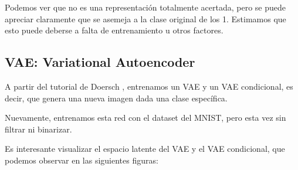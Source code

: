 \documentclass[11pt]{article}
\begin{document}
Podemos ver que no es una representación totalmente acertada, pero se puede apreciar claramente que se asemeja a la clase original de los 1. Estimamos que esto puede deberse a falta de entrenamiento u otros factores.
\newpage
\subsection{VAE: Variational Autoencoder}

A partir del tutorial de Doersch \cite{vae}, entrenamos un VAE y un VAE condicional, es decir, que genera una nueva imagen dada una clase específica.

Nuevamente, entrenamos esta red con el dataset del MNIST, pero esta vez sin filtrar ni binarizar.

Es interesante visualizar el espacio latente del VAE y el VAE condicional, que podemos observar en las siguientes figuras:
\end{document}
